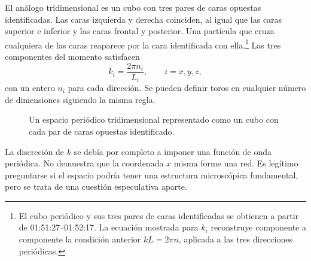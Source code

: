 El análogo tridimensional es un cubo con tres pares de caras opuestas identificadas. Las caras izquierda y derecha coinciden, al igual que las caras superior e inferior y las caras frontal y posterior. Una partícula que cruza cualquiera de las caras reaparece por la cara identificada con ella.\footnote{El cubo periódico y sus tres pares de caras identificadas se obtienen a partir de 01:51:27--01:52:17. La ecuación mostrada para \(k_i\) reconstruye componente a componente la condición anterior \(kL=2\pi n\), aplicada a las tres direcciones periódicas.} Las tres componentes del momento satisfacen
\begin{equation}
k_i=\frac{2\pi n_i}{L_i},
\qquad i=x,y,z,
\end{equation}
con un entero \(n_i\) para cada dirección. Se pueden definir toros en cualquier número de dimensiones siguiendo la misma regla.

\begin{figure}[t]
\centering
{}
\caption{Un espacio periódico tridimensional representado como un cubo con cada par de caras opuestas identificado.}
\end{figure}

\begin{classroomqa}
\end{classroomqa}


La discreción de \(k\) se debía por completo a imponer una función de onda periódica. No demuestra que la coordenada \(x\) misma forme una red. Es legítimo preguntarse si el espacio podría tener una estructura microscópica fundamental, pero se trata de una cuestión especulativa aparte.

